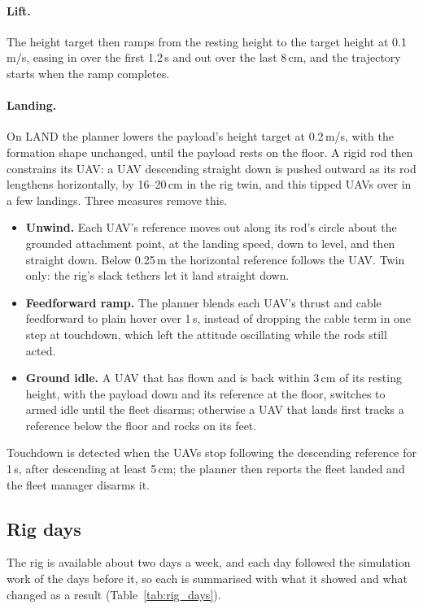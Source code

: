 \paragraph{Lift.} The height target then ramps from the resting height to the target height at 0.1\,m/s,
easing in over the first 1.2\,s and out over the last 8\,cm, and the trajectory starts when the ramp
completes.

\paragraph{Landing.} On LAND the planner lowers the payload's height target at 0.2\,m/s, with the formation
shape unchanged, until the payload rests on the floor. A rigid rod then constrains its UAV: a UAV
descending straight down is pushed outward as its rod lengthens horizontally, by 16--20\,cm in the rig
twin, and this tipped UAVs over in a few landings. Three measures remove this.
\begin{itemize}
    \item \textbf{Unwind.} Each UAV's reference moves out along its rod's circle about the grounded
    attachment point, at the landing speed, down to level, and then straight down. Below 0.25\,m the
    horizontal reference follows the UAV. Twin only: the rig's slack tethers let it land straight down.
    \item \textbf{Feedforward ramp.} The planner blends each UAV's thrust and cable feedforward to plain
    hover over 1\,s, instead of dropping the cable term in one step at touchdown, which left the attitude
    oscillating while the rods still acted.
    \item \textbf{Ground idle.} A UAV that has flown and is back within 3\,cm of its resting height, with
    the payload down and its reference at the floor, switches to armed idle until the fleet disarms;
    otherwise a UAV that lands first tracks a reference below the floor and rocks on its feet.
\end{itemize}
Touchdown is detected when the UAVs stop following the descending reference for 1\,s, after descending at
least 5\,cm; the planner then reports the fleet landed and the fleet manager disarms it.

\subsection{Rig days}

The rig is available about two days a week, and each day followed the simulation work of the days
before it, so each is summarised with what it showed and what changed as a result
(Table~\ref{tab:rig_days}).

